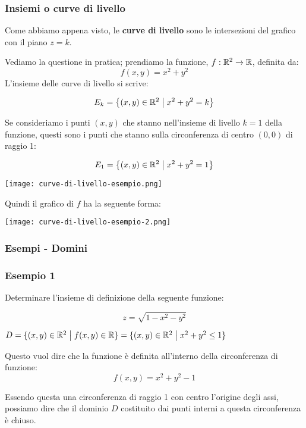 \subsubsection{Insiemi o curve di livello}

Come abbiamo appena visto, le \textbf{curve di livello} sono le intersezioni del grafico con il piano \(z=k\).

Vediamo la questione in pratica; prendiamo la funzione, \(f: \mathbb{R}^2 \to \mathbb{R} \), definita da:
\[
    f(x,y) = x^2 + y^2
\]
L'insieme delle curve di livello si scrive:

\[
    E_k = \left\{ (x,y) \in \mathbb{R}^{2} \;\big|\; x^{2}+y^{2}=k \right\}
\]

Se consideriamo i punti \((x,y)\) che stanno nell'insieme di livello \(k=1\) della funzione, questi sono i punti che stanno sulla circonferenza di centro \((0,0)\) di raggio 1:

\[
    E_1 = \left\{ (x,y) \in \mathbb{R}^{2} \;\big|\; x^{2}+y^{2}=1 \right\}
\]

\begin{center}
    \texttt{[image: curve-di-livello-esempio.png]}
\end{center}

\filbreak{}
Quindi il grafico di \(f\) ha la seguente forma:

\begin{center}
    \texttt{[image: curve-di-livello-esempio-2.png]}
\end{center}

\pagebreak
\subsubsection{Esempi {-} Domini}

\subsubsection*{Esempio 1}

Determinare l'insieme di definizione della seguente funzione:

\[
    z = \sqrt{1-x^{2}-y^{2}}
\]

\(D = \{(x,y) \in \mathbb{R}^2 \;\big|\; f(x,y) \in \mathbb{R} \} = \{(x,y) \in \mathbb{R}^{2} \;\big|\; x^{2}+y^{2} \le 1\} \)

Questo vuol dire che la funzione è definita all'interno della circonferenza di funzione:
\[
    f(x,y) = x^2+y^2-1
\]

Essendo questa una circonferenza di raggio 1 con centro l'origine degli assi, possiamo dire che il dominio \(D\) costituito dai punti interni a questa circonferenza è chiuso.

